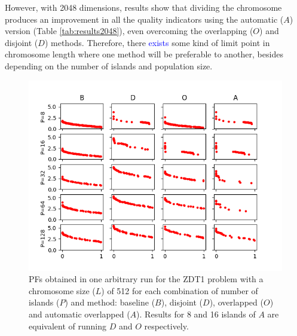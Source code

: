 \documentclass[preprint]{elsarticle}
\begin{document}
However, with 2048 dimensions, results show that dividing the chromosome produces an improvement in all the quality indicators using the automatic ($A$) version (Table \ref{tab:results2048}), even overcoming the overlapping ($O$) and disjoint ($D$) methods. Therefore, there \textcolor{blue}{exists} some kind of limit point in chromosome length where one method will be preferable to another, besides depending on the number of islands and population size.

\begin{figure}
\centering
\includegraphics[width=12cm]{plot_zdt1_512.png}
\caption{PFs obtained in one arbitrary run for the ZDT1 problem with a chromosome size ($L$) of 512 for each combination of number of islands ($P$) and method: baseline ($B$), disjoint ($D$), overlapped ($O$) and automatic overlapped ($A$). Results for 8 and 16 islands of $A$ are equivalent of running $D$ and $O$ respectively. }
\label{fig:plot_zdt1_512}
\end{figure}
\end{document}

